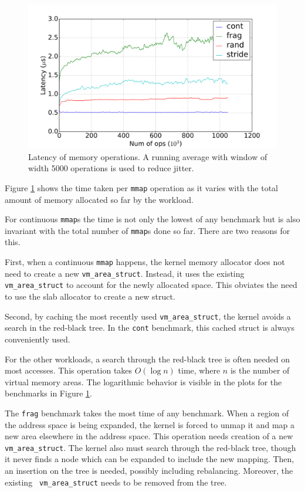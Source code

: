 \documentclass[twocolumn,11pt]{article}
\begin{document}
\begin{figure}[t]
    \includegraphics[width=\columnwidth]{figures/mmap_latency}
    \caption{Latency of memory operations. A running average with window of
    width 5000 operations is used to reduce jitter.}
    \label{fig:mmap_latency}
\end{figure}


Figure \ref{fig:mmap_latency} shows the time taken
per \texttt{mmap} operation as it varies with the total amount of memory allocated
so far by the workload. 

For continuous \texttt{mmap}s the time is not only the lowest of any benchmark
but is also invariant with the total number of \texttt{mmap}s done so far.
There are two reasons for this. 

First, when a continuous \texttt{mmap} happens, the
kernel memory allocator does not need to create a new \texttt{vm\_area\_struct}.
Instead, it uses the existing \texttt{vm\_area\_struct} to account for the
newly allocated space. This obviates the need to use the slab allocator to create
a new struct. 

Second, by caching the
most recently used \texttt{vm\_area\_struct}, the kernel avoids a search in the
red-black tree. In the \texttt{cont} benchmark, this cached struct is always
conveniently used.

For the other workloads, a search through the red-black tree is often needed on
most accesses. This operation takes $O(\log n)$ time, where $n$ is the number of
virtual memory areas. The logarithmic behavior is visible in the plots for the
benchmarks in Figure \ref{fig:mmap_latency}.

The \texttt{frag} benchmark takes the most time of any benchmark. When a region of the
address space is being expanded, the kernel is forced to unmap it and map a new
area elsewhere in the address space. This operation needs creation of a new
\texttt{vm\_area\_struct}.  The kernel also must search through the red-black
tree, though it never finds a node which can be expanded to include the new
mapping. Then, an insertion on the tree is needed, possibly including
rebalancing. Moreover, the existing \texttt{ vm\_area\_struct} needs to be
removed from the tree. 
\end{document}
